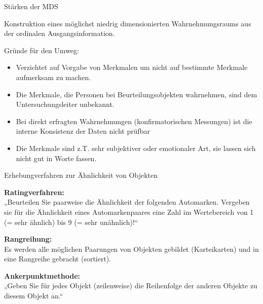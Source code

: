 \documentclass[12pt,ngerman,a4paper,ignorenonframetext,]{beamer}
\providecommand{\tightlist}{%
  \setlength{\itemsep}{0pt}\setlength{\parskip}{0pt}}
\begin{document}
\begin{frame}{Stärken der MDS}
\protect\hypertarget{starken-der-mds}{}

Konstruktion eines möglichst niedrig dimensionierten Wahrnehmungsraums
aus der ordinalen Ausgangsinformation.

Gründe für den Umweg:

\begin{itemize}
\tightlist
\item
  Verzichtet auf Vorgabe von Merkmalen um nicht auf bestimmte Merkmale
  aufmerksam zu machen.
\item
  Die Merkmale, die Personen bei Beurteilungsobjekten wahrnehmen, sind
  dem Untersuchungsleiter unbekannt.
\item
  Bei direkt erfragten Wahrnehmungen (konfirmatorischen Messungen) ist
  die interne Konsistenz der Daten nicht prüfbar
\item
  Die Merkmale sind z.\thinspace{}T. sehr subjektiver oder emotionaler
  Art, sie lassen sich nicht gut in Worte fassen.
\end{itemize}

\end{frame}

\begin{frame}{Erhebungverfahren zur Ähnlichkeit von Objekten}
\protect\hypertarget{erhebungverfahren-zur-ahnlichkeit-von-objekten}{}

\textbf{Ratingverfahren:}\\
„Beurteilen Sie paarweise die Ähnlichkeit der folgenden Automarken.
Vergeben sie für die Ähnlichkeit eines Automarkenpaares eine Zahl im
Wertebereich von 1 (= sehr ähnlich) bis 9 (= sehr unähnlich)!``

\textbf{Rangreihung:}\\
Es werden alle möglichen Paarungen von Objekten gebildet (Karteikarten)
und in eine Rangreihe gebracht (sortiert).

\textbf{Ankerpunktmethode:}\\
„Geben Sie für jedes Objekt (zeilenweise) die Reihenfolge der anderen
Objekte zu diesem Objekt an.``

\end{frame}
\end{document}
